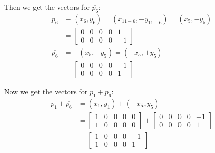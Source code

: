 \documentclass[11pt]{article}
\begin{document}
Then we get the vectors for $\overline{p_6}$:
\begin{align}
p_6 &\equiv (x_6,y_6) = (x_{11-6},-y_{11-6}) = (x_5,-y_5)\\
    &= \left[\begin{array}{ccccc}0&0&0&0&1 \\ 0&0&0&0&-1 \end{array}\right]\\
\overline{p_6} &= -(x_5,-y_5) = (-x_5,+y_5)\\
    &= \left[\begin{array}{ccccc}0&0&0&0&-1 \\ 0&0&0&0&1 \end{array}\right]
\end{align}

Now we get the vectors for $p_1+\overline{p_6}$:
\begin{align}
p_1 + \overline{p_6} &= (x_1,y_1) + (-x_5,y_5)\\
 &= \left[\begin{array}{ccccc}1&0&0&0&0 \\ 1&0&0&0&0 \end{array}\right] +
 \left[\begin{array}{ccccc}0&0&0&0&-1 \\ 0&0&0&0&1 \end{array}\right]\\
 &= \left[\begin{array}{ccccc}1&0&0&0&-1 \\ 1&0&0&0&1 \end{array}\right]
\end{align}
\end{document}
